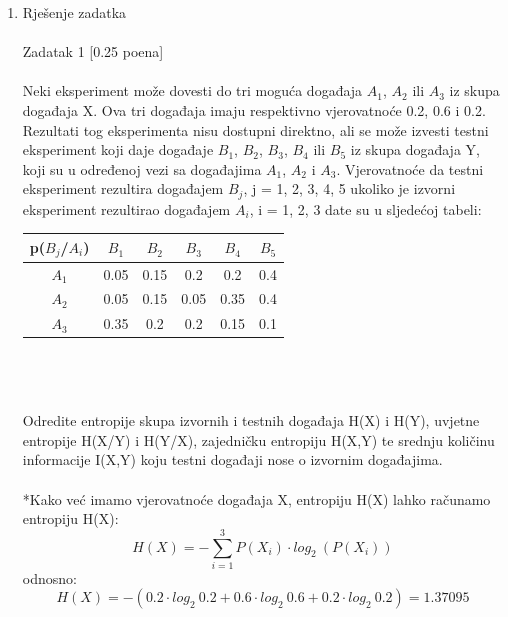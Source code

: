 \documentclass[12pt]{article}
\begin{document}
    
	\begin{enumerate}
		\item Rješenje zadatka \\
		\\
		Zadatak 1 [0.25 poena] \\
        \\
Neki eksperiment može dovesti do tri moguća događaja $A_1$, $A_2$ ili $A_3$ iz skupa događaja X. Ova tri događaja imaju respektivno vjerovatnoće 0.2, 0.6 i 0.2. Rezultati tog eksperimenta nisu dostupni direktno, ali se može izvesti testni eksperiment koji daje događaje $B_1$, $B_2$, $B_3$, $B_4$ ili $B_5$ iz skupa događaja Y, koji su u određenoj vezi sa događajima $A_1$, $A_2$ i $A_3$. Vjerovatnoće da testni eksperiment rezultira događajem $B_j$, j = 1, 2, 3, 4, 5 ukoliko je izvorni eksperiment rezultirao događajem $A_i$, i = 1, 2, 3 date su u sljedećoj tabeli: \\

\begin{tabular}{|c|c|c|c|c|c|}
\hline
p(${B_j}$/${A_i}$) & ${B_1}$   & ${B_2}$   &  ${B_3}$  & ${B_4}$ & ${B_5}$   \\ \hline
${A_1}$                           & 0.05  & 0.15 & 0.2 & 0.2  & 0.4  \\ \hline
${A_2}$                          & 0.05 & 0.15 & 0.05  & 0.35 & 0.4 \\ \hline
${A_3}$                         & 0.35 & 0.2  & 0.2  & 0.15 & 0.1  \\ \hline
\end{tabular} \\ 
\\ 
\\ 
Odredite entropije skupa izvornih i testnih događaja H(X) i H(Y), uvjetne entropije H(X/Y) i H(Y/X), zajedničku entropiju H(X,Y) te srednju količinu informacije I(X,Y) koju testni događaji nose o izvornim događajima. \\
\\
*Kako već imamo vjerovatnoće događaja X, entropiju H(X) lahko računamo
entropiju H(X):
\begin{equation*}
    H(X) = - \sum_{i = 1}^3 P(X_i) \cdot log_2~(P(X_i))
\end{equation*}
odnosno:
\begin{equation*}
    H(X) = - (0.2 \cdot log_2~0.2 + 0.6 \cdot log_2~0.6 + 0.2 \cdot log_2~0.2) = 1.37095
\end{equation*}


\end{enumerate}
\end{document}
